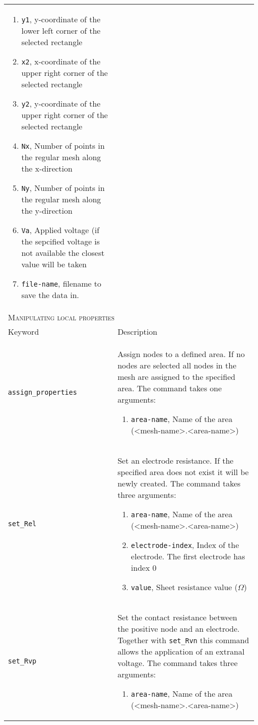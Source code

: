 \documentclass[noshowpacs,preprintnumbers,amsmath,amssymb, letter]{revtex4}
\begin{document}
\begin{longtable}{p{}p{}}
\begin{enumerate}
\item \texttt{y1}, y-coordinate of the lower left corner of the selected rectangle
\item \texttt{x2}, x-coordinate of the upper right corner of the selected rectangle
\item \texttt{y2}, y-coordinate of the upper right corner of the selected rectangle
\item \texttt{Nx}, Number of points in the regular mesh along the x-direction
\item \texttt{Ny}, Number of points in the regular mesh along the y-direction
\item \texttt{Va}, Applied voltage (if the sepcified voltage is not available the closest value will be taken
\item \texttt{file-name}, filename to save the data in.
\end{enumerate}\\
\multicolumn{2}{l}{\textsc{Manipulating local properties}} \\*
\hline
Keyword & Description \\
\texttt{assign\_properties}	&  Assign nodes to a defined area. If no nodes are selected all nodes in the mesh are assigned to the specified area. The command takes one arguments:
\begin{enumerate}
\item \texttt{area-name}, Name of the area (\textless mesh-name\textgreater .\textless area-name\textgreater )
\end{enumerate}\\
\texttt{set\_Rel}	&  Set an electrode resistance. If the specified area does not exist it will be newly created. The command takes three arguments:
\begin{enumerate}
\item \texttt{area-name}, Name of the area (\textless mesh-name\textgreater .\textless area-name\textgreater )
\item \texttt{electrode-index}, Index of the electrode. The first electrode has index 0
\item \texttt{value}, Sheet resistance value ($\Omega$)
\end{enumerate}\\
\texttt{set\_Rvp}	&  Set the contact resistance between the positive node and an electrode. Together with \texttt{set\_Rvn} this command allows the application of an extranal voltage. The command takes three arguments:
\begin{enumerate}
\item \texttt{area-name}, Name of the area (\textless mesh-name\textgreater .\textless area-name\textgreater )

\end{enumerate}
\end{longtable}
\end{document}
